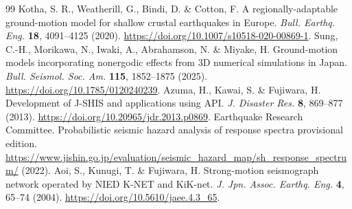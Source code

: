 \documentclass[10pt]{article}
\begin{document}
\begin{thebibliography}{99}
 Kotha, S. R., Weatherill, G., Bindi, D. \& Cotton, F. A regionally-adaptable ground-motion model for shallow crustal earthquakes in Europe. \textit{Bull. Earthq. Eng.} \textbf{18}, 4091--4125 (2020). \url{https://doi.org/10.1007/s10518-020-00869-1}.
 Sung, C.-H., Morikawa, N., Iwaki, A., Abrahamson, N. \& Miyake, H. Ground-motion models incorporating nonergodic effects from 3D numerical simulations in Japan. \textit{Bull. Seismol. Soc. Am.} \textbf{115}, 1852--1875 (2025). \url{https://doi.org/10.1785/0120240239}.
 Azuma, H., Kawai, S. \& Fujiwara, H. Development of J-SHIS and applications using API. \textit{J. Disaster Res.} \textbf{8}, 869--877 (2013). \url{https://doi.org/10.20965/jdr.2013.p0869}.
 Earthquake Research Committee. Probabilistic seismic hazard analysis of response spectra provisional edition. \url{https://www.jishin.go.jp/evaluation/seismic_hazard_map/sh_response_spectrum/} (2022).
 Aoi, S., Kunugi, T. \& Fujiwara, H. Strong-motion seismograph network operated by NIED K-NET and KiK-net. \textit{J. Jpn. Assoc. Earthq. Eng.} \textbf{4}, 65--74 (2004). \url{https://doi.org/10.5610/jaee.4.3_65}.
\end{thebibliography}
\end{document}

